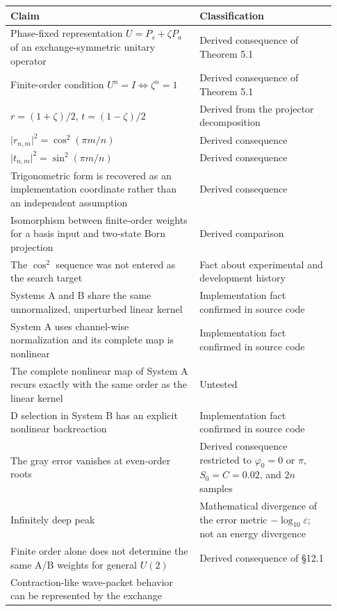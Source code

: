 \documentclass[
  a4paper,
  10pt]{article}
\newcounter{none} %
\begin{document}
{\def\LTcaptype{none} %
\small
\begin{longtable}[]{@{}p{0.54\linewidth}p{0.39\linewidth}@{}}
\toprule\noalign{}
Claim & Classification \\
\midrule\noalign{}
\endhead
\bottomrule\noalign{}
\endlastfoot
Phase-fixed representation \(U=P_s+\zeta P_a\) of an exchange-symmetric
unitary operator & Derived consequence of Theorem 5.1 \\
Finite-order condition \(U^n=I\Leftrightarrow\zeta^n=1\) & Derived
consequence of Theorem 5.1 \\
\(r=(1+\zeta)/2\), \(t=(1-\zeta)/2\) & Derived from the projector
decomposition \\
\(\lvert r_{n,m}\rvert^2=\cos^2(\pi m/n)\) & Derived consequence \\
\(\lvert t_{n,m}\rvert^2=\sin^2(\pi m/n)\) & Derived consequence \\
Trigonometric form is recovered as an implementation coordinate rather
than an independent assumption & Derived consequence \\
Isomorphism between finite-order weights for a basis input and two-state
Born projection & Derived comparison \\
The \(\cos^2\) sequence was not entered as the search target & Fact
about experimental and development history \\
Systems A and B share the same unnormalized, unperturbed linear kernel &
Implementation fact confirmed in source code \\
System A uses channel-wise normalization and its complete map is
nonlinear & Implementation fact confirmed in source code \\
The complete nonlinear map of System A recurs exactly with the same
order as the linear kernel & Untested \\
D selection in System B has an explicit nonlinear backreaction &
Implementation fact confirmed in source code \\
The gray error vanishes at even-order roots & Derived consequence
restricted to \(\varphi_0=0\) or \(\pi\), \(S_0=C=0.02\), and \(2n\)
samples \\
Infinitely deep peak & Mathematical divergence of the error metric
\(-\log_{10}\varepsilon\); not an energy divergence \\
Finite order alone does not determine the same A/B weights for general
\(U(2)\) & Derived consequence of §12.1 \\
Contraction-like wave-packet behavior can be represented by the exchange

\end{longtable}}
\end{document}

